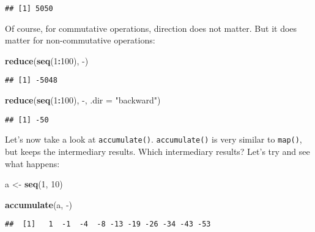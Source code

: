 \documentclass[
]{article}
\newenvironment{Shaded}{\begin{snugshade}}{\end{snugshade}}
\newcommand{\DataTypeTok}[1]{\textcolor[rgb]{0.13,0.29,0.53}{#1}}
\newcommand{\DecValTok}[1]{\textcolor[rgb]{0.00,0.00,0.81}{#1}}
\newcommand{\KeywordTok}[1]{\textcolor[rgb]{0.13,0.29,0.53}{\textbf{#1}}}
\newcommand{\NormalTok}[1]{#1}
\newcommand{\OperatorTok}[1]{\textcolor[rgb]{0.81,0.36,0.00}{\textbf{#1}}}
\newcommand{\StringTok}[1]{\textcolor[rgb]{0.31,0.60,0.02}{#1}}
\begin{document}
\begin{verbatim}
## [1] 5050
\end{verbatim}

Of course, for commutative operations, direction does not matter. But it does matter for non-commutative
operations:

\begin{Shaded}
\begin{Highlighting}[]
\KeywordTok{reduce}\NormalTok{(}\KeywordTok{seq}\NormalTok{(}\DecValTok{1}\OperatorTok{:}\DecValTok{100}\NormalTok{), }\StringTok{\textasciigrave{}}\DataTypeTok{{-}}\StringTok{\textasciigrave{}}\NormalTok{)}
\end{Highlighting}
\end{Shaded}

\begin{verbatim}
## [1] -5048
\end{verbatim}

\begin{Shaded}
\begin{Highlighting}[]
\KeywordTok{reduce}\NormalTok{(}\KeywordTok{seq}\NormalTok{(}\DecValTok{1}\OperatorTok{:}\DecValTok{100}\NormalTok{), }\StringTok{\textasciigrave{}}\DataTypeTok{{-}}\StringTok{\textasciigrave{}}\NormalTok{, }\DataTypeTok{.dir =} \StringTok{"backward"}\NormalTok{)}
\end{Highlighting}
\end{Shaded}

\begin{verbatim}
## [1] -50
\end{verbatim}

Let's now take a look at \texttt{accumulate()}. \texttt{accumulate()} is very similar to \texttt{map()}, but keeps the
intermediary results. Which intermediary results? Let's try and see what happens:

\begin{Shaded}
\begin{Highlighting}[]
\NormalTok{a \textless{}{-}}\StringTok{ }\KeywordTok{seq}\NormalTok{(}\DecValTok{1}\NormalTok{, }\DecValTok{10}\NormalTok{)}

\KeywordTok{accumulate}\NormalTok{(a, }\StringTok{\textasciigrave{}}\DataTypeTok{{-}}\StringTok{\textasciigrave{}}\NormalTok{)}
\end{Highlighting}
\end{Shaded}

\begin{verbatim}
##  [1]   1  -1  -4  -8 -13 -19 -26 -34 -43 -53
\end{verbatim}
\end{document}
